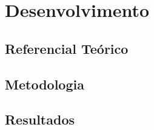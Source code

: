 \chapter{Desenvolvimento}

\section{Referencial Teórico}

\section{Metodologia}

\section{Resultados}
